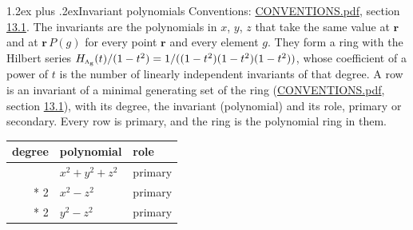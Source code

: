 \documentclass[10pt,a4paper]{article}
\makeatletter
\renewcommand\section{\@startsection{section}{1}{\z@}{-3ex plus -1ex minus -.2ex}%
  {1.2ex plus .2ex}{\normalfont\large\sffamily\bfseries\color{parttitle}}}
\numberwithin{equation}{section}
\newcommand{\irr}[1]{\text{\normalfont\scshape #1}}
\newcommand{\ptag}[1]{\mathrm{#1}}
\newcommand{\pointr}{\mathbf{r}}
\makeatother
\begin{document}
\section{Invariant polynomials}\label{s:invariant_polynomials}
Conventions: \href{../../CONVENTIONS.pdf}{CONVENTIONS.pdf}, section \href{../../CONVENTIONS.pdf\#conv.13.1}{13.1}.
The invariants are the polynomials in $x$, $y$, $z$ that take the same value at $\pointr$ and at $\pointr\,P(g)$ for every point $\pointr$ and every element $g$. They form a ring with the Hilbert series $H_{\irr{a}_{\ptag{g}}}(t)/(1-t^{2}) = 1/((1-t^{2})(1-t^{2})(1-t^{2}))$, whose coefficient of a power of $t$ is the number of linearly independent invariants of that degree. \label{n:head.degree}\label{n:head.role}A row is an invariant of a minimal generating set of the ring (\href{../../CONVENTIONS.pdf}{CONVENTIONS.pdf}, section \href{../../CONVENTIONS.pdf\#conv.13.1}{13.1}), with its degree, the invariant (polynomial) and its role, primary or secondary. Every row is primary, and the ring is the polynomial ring in them.
{\small\begin{longtable}{@{}rll@{}}\toprule
degree & polynomial & role\\\midrule\endhead
\bottomrule\endfoot\endlastfoot
2 & $x^{2} + y^{2} + z^{2}$ & primary\\*
2 & $x^{2} - z^{2}$ & primary\\*
2 & $y^{2} - z^{2}$ & primary\\
\bottomrule\end{longtable}}
\end{document}
